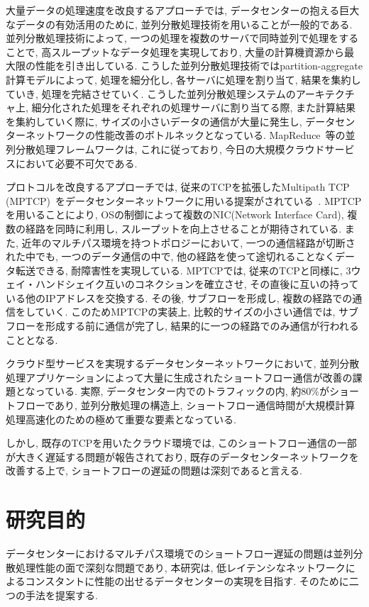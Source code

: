 大量データの処理速度を改良するアプローチでは, データセンターの抱える巨大なデータの有効活用のために, 並列分散処理技術を用いることが一般的である. 
並列分散処理技術によって, 一つの処理を複数のサーバで同時並列で処理をすることで,
高スループットなデータ処理を実現しており, 大量の計算機資源から最大限の性能を引き出している. 
こうした並列分散処理技術ではpartition-aggregate計算モデルによって, 処理を細分化し, 各サーバに処理を割り当て, 結果を集約していき,
処理を完結させていく. 
こうした並列分散処理システムのアーキテクチャ上, 細分化された処理をそれぞれの処理サーバに割り当てる際, また計算結果を集約していく際に, 
サイズの小さいデータの通信が大量に発生し, データセンターネットワークの性能改善のボトルネックとなっている. 
MapReduce~\cite{mapreduce}等の並列分散処理フレームワークは,
これに従っており, 今日の大規模クラウドサービスにおいて必要不可欠である.

プロトコルを改良するアプローチでは, 
従来のTCPを拡張したMultipath TCP
(MPTCP)~\cite{mptcp}をデータセンターネットワークに用いる提案がされている~\cite{fattree}.
MPTCPを用いることにより, OSの制御によって複数のNIC(Network Interface Card), 複数の経路を同時に利用し,
スループットを向上させることが期待されている.
また, 近年のマルチパス環境を持つトポロジーにおいて, 一つの通信経路が切断された中でも,
一つのデータ通信の中で, 他の経路を使って途切れることなくデータ転送できる, 耐障害性を実現している. 
MPTCPでは, 従来のTCPと同様に, 3ウェイ・ハンドシェイク互いのコネクションを確立させ, その直後に互いの持っている他のIPアドレスを交換する. 
その後, サブフローを形成し, 複数の経路での通信をしていく. 
このためMPTCPの実装上, 比較的サイズの小さい通信では, サブフローを形成する前に通信が完了し, 結果的に一つの経路でのみ通信が行われることとなる. 

クラウド型サービスを実現するデータセンターネットワークにおいて,
並列分散処理アプリケーションによって大量に生成されたショートフロー通信が改善の課題となっている. \cite{improving}
実際, データセンター内でのトラフィックの内, 約80\%がショートフローであり, 並列分散処理の構造上,
ショートフロー通信時間が大規模計算処理高速化のための極めて重要な要素となっている. 

しかし, 既存のTCPを用いたクラウド環境では, このショートフロー通信の一部が大きく遅延する問題が報告されており,
既存のデータセンターネットワークを改善する上で, ショートフローの遅延の問題は深刻であると言える\cite{improving, rtt}.


\section{研究目的}
データセンターにおけるマルチパス環境でのショートフロー遅延の問題は並列分散処理性能の面で深刻な問題であり,
本研究は, 低レイテンシなネットワークによるコンスタントに性能の出せるデータセンターの実現を目指す.
そのために二つの手法を提案する. 

